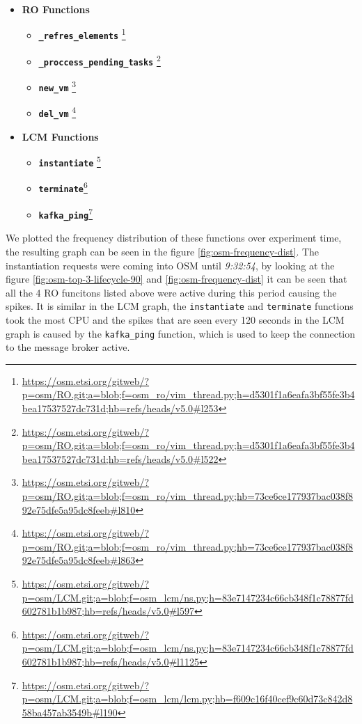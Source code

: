 \begin{itemize}
\item \textbf{RO Functions}
\begin{itemize}
\item \texttt{\textbf{\_refres\_elements}} \footnote{\url{https://osm.etsi.org/gitweb/?p=osm/RO.git;a=blob;f=osm\_ro/vim\_thread.py;h=d5301f1a6eafa3bf55fe3b4bea17537527dc731d;hb=refs/heads/v5.0\#l253}}

\item \texttt{\textbf{\_proccess\_pending\_tasks}} \footnote{\url{https://osm.etsi.org/gitweb/?p=osm/RO.git;a=blob;f=osm\_ro/vim\_thread.py;h=d5301f1a6eafa3bf55fe3b4bea17537527dc731d;hb=refs/heads/v5.0\#l522}}

\item \texttt{\textbf{new\_vm}} \footnote{\url{https://osm.etsi.org/gitweb/?p=osm/RO.git;a=blob;f=osm\_ro/vim\_thread.py;hb=73ce6ce177937bac038f892e75dfe5a95dc8feeb\#l810}}

\item \texttt{\textbf{del\_vm}} \footnote{\url{https://osm.etsi.org/gitweb/?p=osm/RO.git;a=blob;f=osm\_ro/vim\_thread.py;hb=73ce6ce177937bac038f892e75dfe5a95dc8feeb\#l863}}
\end{itemize}

\item \textbf{LCM Functions}

\begin{itemize}

\item \texttt{\textbf{instantiate}} \footnote{\url{https://osm.etsi.org/gitweb/?p=osm/LCM.git;a=blob;f=osm\_lcm/ns.py;h=83e7147234c66cb348f1c78877fd602781b1b987;hb=refs/heads/v5.0\#l597}}

\item \texttt{\textbf{terminate}}\footnote{\url{https://osm.etsi.org/gitweb/?p=osm/LCM.git;a=blob;f=osm\_lcm/ns.py;h=83e7147234c66cb348f1c78877fd602781b1b987;hb=refs/heads/v5.0\#l1125}}

\item \texttt{\textbf{kafka\_ping}}\footnote{\url{https://osm.etsi.org/gitweb/?p=osm/LCM.git;a=blob;f=osm\_lcm/lcm.py;hb=f609c16f40cef9c60d73c842d858ba457ab3549b\#l190}}
\end{itemize}

\end{itemize}

We plotted the frequency distribution of these functions over experiment time, the resulting graph can be seen in the figure \ref{fig:osm-frequency-dist}. The instantiation requests were coming into OSM until \textit{9:32:54}, by looking at the figure \ref{fig:osm-top-3-lifecycle-90} and \ref{fig:osm-frequency-dist} it can be seen that all the 4 RO funcitons listed above were active during this period causing the spikes. It is similar in the LCM graph, the \texttt{instantiate} and \texttt{terminate}  functions took the most CPU and the spikes that are seen every 120 seconds in the LCM graph is caused by the \texttt{kafka\_ping} function, which is used to keep the connection to the message broker active. 

